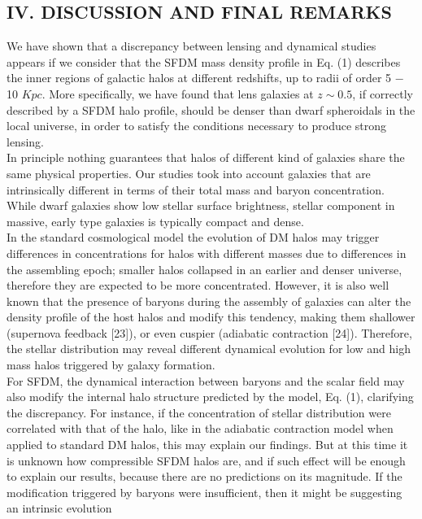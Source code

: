 \documentclass{article}
\begin{document}
\begin{multicols}{2}[]
\section*{\normalsize{IV. DISCUSSION AND FINAL REMARKS}}
We have shown that a discrepancy between lensing and
dynamical studies appears if we consider that the SFDM
mass density profile in Eq. (1) describes the inner regions
of galactic halos at different redshifts, up to radii of order
5 − 10 $Kpc$. More specifically, we have found that lens
galaxies at $z \sim 0.5$, if correctly described by a SFDM halo
profile, should be denser than dwarf spheroidals in the
local universe, in order to satisfy the conditions necessary
to produce strong lensing.
\\In principle nothing guarantees that halos of different kind of galaxies share the same physical properties.
Our studies took into account galaxies that are intrinsically different in terms of their total mass and baryon
concentration. While dwarf galaxies show low stellar surface brightness, stellar component in massive, early type
galaxies is typically compact and dense.
\\In the standard cosmological model the evolution of
DM halos may trigger differences in concentrations for
halos with different masses due to differences in the assembling epoch; smaller halos collapsed in an earlier and
denser universe, therefore they are expected to be more
concentrated. However, it is also well known that the
presence of baryons during the assembly of galaxies can
alter the density profile of the host halos and modify
this tendency, making them shallower (supernova feedback [23]), or even cuspier (adiabatic contraction [24]).
Therefore, the stellar distribution may reveal different
dynamical evolution for low and high mass halos triggered by galaxy formation.
\\For SFDM, the dynamical interaction between baryons
and the scalar field may also modify the internal halo
structure predicted by the model, Eq. (1), clarifying the
discrepancy. For instance, if the concentration of stellar distribution were correlated with that of the halo,
like in the adiabatic contraction model when applied to
standard DM halos, this may explain our findings. But at this time it is unknown how compressible SFDM halos are, and if such effect will be enough to explain our
results, because there are no predictions on its magnitude. If the modification triggered by baryons were insufficient, then it might be suggesting an intrinsic evolution

\end{multicols}
\end{document}
